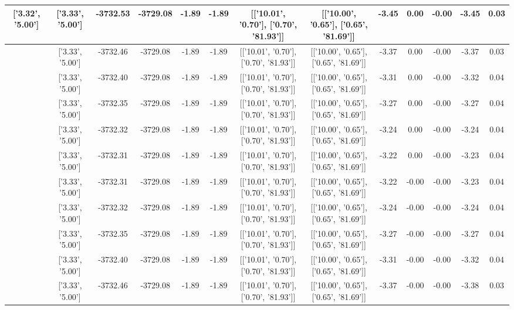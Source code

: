 \begin{table}[htbp]
\begin{adjustbox}{angle=90}
\begin{tabular}{|c|c|c|c|c|c|c|c|c|c|c|c|c|}
 ['3.32', '5.00'] & ['3.33', '5.00'] & -3732.53 & -3729.08 & -1.89 & -1.89 & [['10.01', '0.70'], ['0.70', '81.93']] & [['10.00', '0.65'], ['0.65', '81.69']] & -3.45 & 0.00 & -0.00 & -3.45 & 0.03\\ \hline
 ['3.33', '5.00'] & ['3.33', '5.00'] & -3732.46 & -3729.08 & -1.89 & -1.89 & [['10.01', '0.70'], ['0.70', '81.93']] & [['10.00', '0.65'], ['0.65', '81.69']] & -3.37 & 0.00 & -0.00 & -3.37 & 0.03\\ \hline
 ['3.33', '5.00'] & ['3.33', '5.00'] & -3732.40 & -3729.08 & -1.89 & -1.89 & [['10.01', '0.70'], ['0.70', '81.93']] & [['10.00', '0.65'], ['0.65', '81.69']] & -3.31 & 0.00 & -0.00 & -3.32 & 0.04\\ \hline
 ['3.33', '5.00'] & ['3.33', '5.00'] & -3732.35 & -3729.08 & -1.89 & -1.89 & [['10.01', '0.70'], ['0.70', '81.93']] & [['10.00', '0.65'], ['0.65', '81.69']] & -3.27 & 0.00 & -0.00 & -3.27 & 0.04\\ \hline
 ['3.33', '5.00'] & ['3.33', '5.00'] & -3732.32 & -3729.08 & -1.89 & -1.89 & [['10.01', '0.70'], ['0.70', '81.93']] & [['10.00', '0.65'], ['0.65', '81.69']] & -3.24 & 0.00 & -0.00 & -3.24 & 0.04\\ \hline
 ['3.33', '5.00'] & ['3.33', '5.00'] & -3732.31 & -3729.08 & -1.89 & -1.89 & [['10.01', '0.70'], ['0.70', '81.93']] & [['10.00', '0.65'], ['0.65', '81.69']] & -3.22 & 0.00 & -0.00 & -3.23 & 0.04\\ \hline
 ['3.33', '5.00'] & ['3.33', '5.00'] & -3732.31 & -3729.08 & -1.89 & -1.89 & [['10.01', '0.70'], ['0.70', '81.93']] & [['10.00', '0.65'], ['0.65', '81.69']] & -3.22 & -0.00 & -0.00 & -3.23 & 0.04\\ \hline
 ['3.33', '5.01'] & ['3.33', '5.00'] & -3732.32 & -3729.08 & -1.89 & -1.89 & [['10.01', '0.70'], ['0.70', '81.93']] & [['10.00', '0.65'], ['0.65', '81.69']] & -3.24 & -0.00 & -0.00 & -3.24 & 0.04\\ \hline
 ['3.33', '5.01'] & ['3.33', '5.00'] & -3732.35 & -3729.08 & -1.89 & -1.89 & [['10.01', '0.70'], ['0.70', '81.93']] & [['10.00', '0.65'], ['0.65', '81.69']] & -3.27 & -0.00 & -0.00 & -3.27 & 0.04\\ \hline
 ['3.33', '5.01'] & ['3.33', '5.00'] & -3732.40 & -3729.08 & -1.89 & -1.89 & [['10.01', '0.70'], ['0.70', '81.93']] & [['10.00', '0.65'], ['0.65', '81.69']] & -3.31 & -0.00 & -0.00 & -3.32 & 0.04\\ \hline
 ['3.34', '5.01'] & ['3.33', '5.00'] & -3732.46 & -3729.08 & -1.89 & -1.89 & [['10.01', '0.70'], ['0.70', '81.93']] & [['10.00', '0.65'], ['0.65', '81.69']] & -3.37 & -0.00 & -0.00 & -3.38 & 0.03\\ \hline

\end{tabular}
\end{adjustbox}
\end{table}
